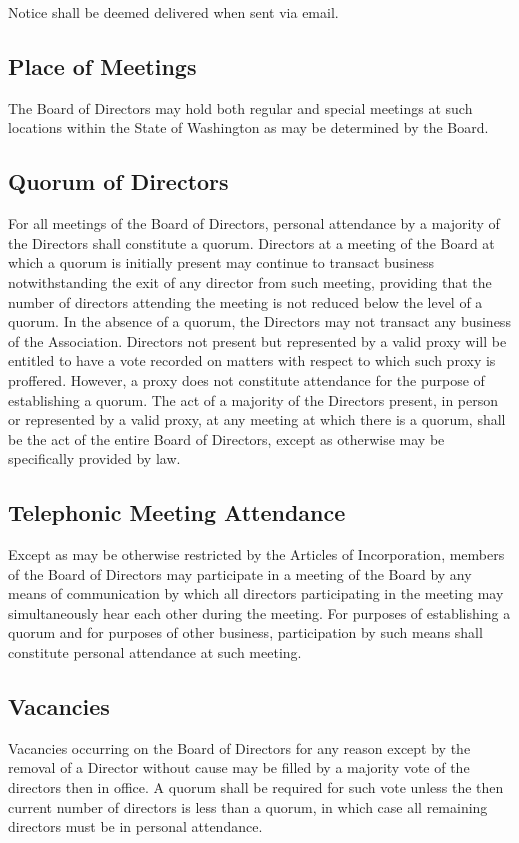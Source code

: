 \documentclass[letterpaper,11pt]{article}
\begin{document}
Notice shall be deemed delivered when sent via email.
\subsection{Place of Meetings}
The Board of Directors may hold both regular and special meetings at such locations within the State of Washington as may be determined by the Board. 
\subsection{Quorum of Directors}
For all meetings of the Board of Directors, personal attendance by a majority of the Directors shall constitute a quorum. Directors at a meeting of the Board at which a quorum is initially present may continue to transact business notwithstanding the exit of any director from such meeting, providing that the number of directors attending the meeting is not reduced below the level of a quorum. In the absence of a quorum, the Directors may not transact any business of the Association. Directors not present but represented by a valid proxy will be entitled to have a vote recorded on matters with respect to which such proxy is proffered. However, a proxy does not constitute attendance for the purpose of establishing a quorum. The act of a majority of the Directors present, in person or represented by a valid proxy, at any meeting at which there is a quorum, shall be the act of the entire Board of Directors, except as otherwise may be specifically provided by law.
\subsection{Telephonic Meeting Attendance}
Except as may be otherwise restricted by the Articles of Incorporation, members of the Board of Directors may participate in a meeting of the Board by any means of communication by which all directors participating in the meeting may simultaneously hear each other during the meeting. For purposes of establishing a quorum and for purposes of other business, participation by such means shall constitute personal attendance at such meeting.
\subsection{Vacancies}
Vacancies occurring on the Board of Directors for any reason except by the removal of a Director without cause may be filled by a majority vote of the directors then in office. A quorum shall be required for such vote unless the then current number of directors is less than a quorum, in which case all remaining directors must be in personal attendance.
\end{document}
